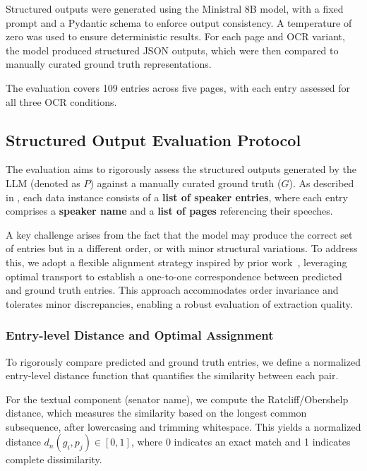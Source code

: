 Structured outputs were generated using the Ministral 8B model, with a fixed prompt and a Pydantic schema to enforce output consistency. A temperature of zero was used to ensure deterministic results. For each page and OCR variant, the model produced structured JSON outputs, which were then compared to manually curated ground truth representations.

The evaluation covers 109 entries across five pages, with each entry assessed for all three OCR conditions.




\subsection{Structured Output Evaluation Protocol}
The evaluation aims to rigorously assess the structured outputs generated by the LLM (denoted as $P$) against a manually curated ground truth ($G$). As described in , each data instance consists of a \textbf{list of speaker entries}, where each entry comprises a \textbf{speaker name} and a \textbf{list of pages} referencing their speeches.

A key challenge arises from the fact that the model may produce the correct set of entries but in a different order, or with minor structural variations. To address this, we adopt a flexible alignment strategy inspired by prior work~\cite{chen_unified_2023,kirillov_panoptic_2019}, leveraging optimal transport to establish a one-to-one correspondence between predicted and ground truth entries. This approach accommodates order invariance and tolerates minor discrepancies, enabling a robust evaluation of extraction quality.

\subsubsection{Entry-level Distance and Optimal Assignment}
To rigorously compare predicted and ground truth entries, we define a normalized entry-level distance function that quantifies the similarity between each pair.

For the textual component (senator name), we compute the Ratcliff/Obershelp distance, which measures the similarity based on the longest common subsequence, after lowercasing and trimming whitespace. This yields a normalized distance $d_n(g_i, p_j) \in [0, 1]$, where 0 indicates an exact match and 1 indicates complete dissimilarity.

